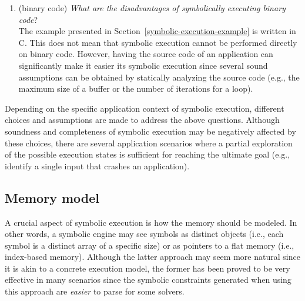 \documentclass[10pt, a4paper]{article}
\begin{document}
\begin{enumerate}
  \item (binary code) {\em What are the disadvantages of symbolically executing binary code}? \\
  The example presented in Section~\ref{symbolic-execution-example} is written in C. This does not mean that symbolic execution cannot be performed directly on binary code. However, having the source code of an application can significantly make it easier its symbolic execution since several sound assumptions can be obtained by statically analyzing the source code (e.g., the maximum size of a buffer or the number of iterations for a loop).
   
\end{enumerate}
Depending on the specific application context of symbolic execution, different choices and assumptions are made to address the above questions. Although soundness and completeness of symbolic execution may be negatively affected by these choices, there are several application scenarios where a partial exploration of the possible execution states is sufficient for reaching the ultimate goal (e.g., identify a single input that crashes an application).

\subsection{Memory model}
A crucial aspect of symbolic execution is how the memory should be modeled. In other words, a symbolic engine may see symbols as distinct objects (i.e., each symbol is a distinct array of a specific size) or as pointers to a flat memory (i.e., index-based memory). Although the latter approach may seem more natural since it is akin to a concrete execution model, the former has been proved to be very effective in many scenarios since the symbolic constraints generated when using this approach are {\em easier} to parse for some solvers.
\end{document}

